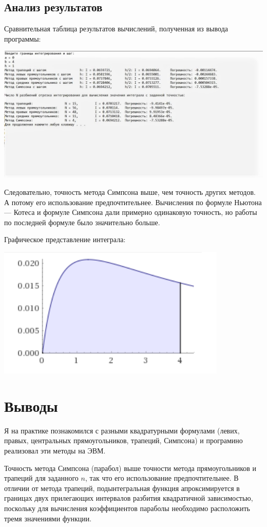 \documentclass[14pt,a4paper,titlepage]{extarticle}
\begin{document}
{\centering\subsection{Анализ результатов}}
Сравнительная таблица результатов вычислений, полученная из вывода программы:
{\centering\includegraphics[scale=0.75]{4}\par}
Следовательно, точность метода Симпсона выше, чем точность других методов. А потому его использование предпочтительнее. Вычисления по формуле Ньютона — Котеса и формуле Симпсона дали 
примерно одинаковую точность, но работы по последней формуле было значительно больше.

Графическое представление интеграла: \\
{\centering\includegraphics[scale=0.75]{5}\par}

{\centering \section*{Выводы}}

Я на практике познакомился с разными квадратурными формулами (левих, правых, центральных прямоугольников, трапеций, Симпсона) и програмино реализовал эти методы на ЭВМ.

Точность метода Симпсона (парабол) выше точности метода прямоугольников и трапеций для заданного $n$, так что его использование предпочтительнее. В отличии от метода трапеций, подынтегральная функция апроксимируется в границах двух прилегающих интервалов разбития квадратичной зависимостью, поскольку для вычисления коэффициентов параболы необходимо расположить тремя значениями функции.
\end{document}
